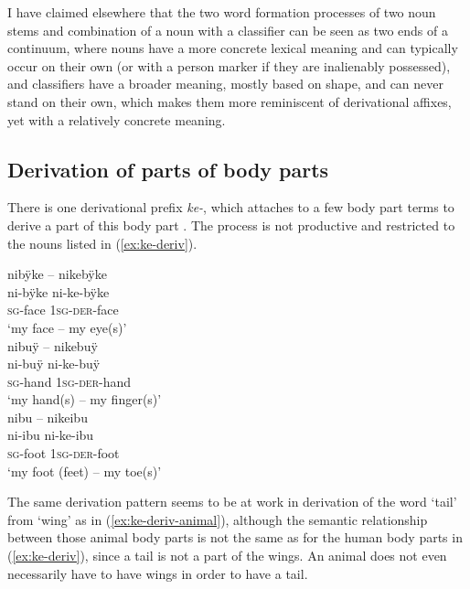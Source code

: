 I have claimed elsewhere \citep[178--180]{Terhart2016} that the two word formation processes of  two noun stems and combination of a noun with a classifier can be seen as two ends of a continuum, where nouns have a more concrete lexical meaning and can typically occur on their own (or with a person marker if they are inalienably possessed), and classifiers have a broader meaning, mostly based on shape, and can never stand on their own, which makes them more reminiscent of derivational affixes, yet with a relatively concrete meaning.

\subsection{Derivation of parts of body parts}\label{sec:BodyPartofPartDerivation}

There is one derivational prefix \textit{ke-}, which attaches to a few body part terms to derive a part of this body part \citep[]{TerhartDanielsenBODY}. The process is not productive and restricted to the nouns listed in (\ref{ex:ke-deriv}).

\ea\label{ex:ke-deriv}
  \ea
 \begingl 
\glpreamble nibÿke – nikebÿke\\
\gla ni-bÿke ni-ke-bÿke\\ 
\textsc{sg}-face 1\textsc{sg}-\textsc{der}-face\\ 
\glft ‘my face – my eye(s)’\\ 
\endgl
  \ex
 \begingl
\glpreamble nibuÿ – nikebuÿ\\
\gla ni-buÿ ni-ke-buÿ\\ 
\textsc{sg}-hand 1\textsc{sg}-\textsc{der}-hand\\ 
\glft ‘my hand(s) – my finger(s)’\\ 
\endgl
  \ex
 \begingl
\glpreamble nibu – nikeibu\\
\gla ni-ibu ni-ke-ibu\\
\textsc{sg}-foot 1\textsc{sg}-\textsc{der}-foot\\
\glft ‘my foot (feet) – my toe(s)’
\endgl
\z
\xe

The same derivation pattern seems to be at work in derivation of the word ‘tail’ from ‘wing’ as in (\ref{ex:ke-deriv-animal}), although the semantic relationship between those animal body parts is not the same as for the human body parts in (\ref{ex:ke-deriv}), since a tail is not a part of the wings. An animal does not even necessarily have to have wings in order to have a tail.

